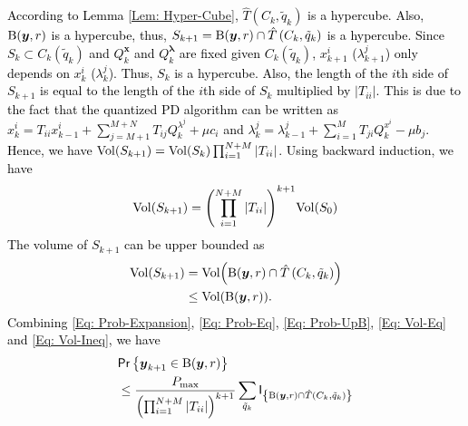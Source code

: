 \documentclass[10pt,twocolumn,twoside]{IEEEtran}
\begin{document}
\begin{IEEEproof}
\textcolor{black}{According to Lemma \ref{Lem: Hyper-Cube}, ${\ensuremath{\hat{T}\left({C_k},{\tilde{q}_k}\right)}}$ is a hypercube. Also, ${\rm B}{\left({{\ensuremath{\boldsymbol{{y}}}},r}\right)}$ is a hypercube, thus,  $S_{k+1}={\rm B}{\left({{\ensuremath{\boldsymbol{{y}}}},r}\right)}\cap {\ensuremath{\hat{T}\left({C_k},{\tilde{q}_k}\right)}}$ is a hypercube. Since $S_k\subset C_k{\left({\tilde{q}_k}\right)}$ and  $Q^{{\ensuremath{\boldsymbol{{x}}}}}_k$ and $Q^{{\ensuremath{\boldsymbol{{\lambda}}}}}_k$ are fixed given $C_k{\left({\tilde{q}_k}\right)}$,  $x^{i}_{k+1}$ ($\lambda^{j}_{k+1}$) only depends on $x^{i}_{k}$ ($\lambda^{j}_{k}$). Thus, $S_k$ is a hypercube. Also, the length of the $i$th side of $S_{k+1}$ is equal to the length of the $i$th side of $S_{k}$ multiplied by ${\left|{T_{ii}}\right|}$. This is due to the fact that the quantized PD algorithm can be written as $x^{i}_{k}=T_{ii}x^{i}_{k-1}+\sum_{j=M+1}^{M+N}T_{ij}Q^{\lambda^j}_k+\mu c_i$ and $\lambda^{j}_{k}=\lambda^j_{k-1}+\sum_{i=1}^MT_{ji}Q^{x^i}_k-\mu b_j$. Hence, we have ${\rm Vol}{\left({S_{k+1}}\right)}={\rm Vol}{\left({S_k}\right)}\prod_{i=1}^{N+M}{\left|{T_{ii}}\right|}$. Using backward induction, we have 
\begin{align}\label{Eq: Vol-Eq}
{\rm Vol}{\left({S_{k+1}}\right)}={\left({\prod_{i=1}^{N+M}{\left|{T_{ii}}\right|}}\right)}^{k+1}{\rm Vol}{\left({S_0}\right)}
\end{align}
The volume of $S_{k+1}$ can be upper bounded as
\begin{align}\label{Eq: Vol-Ineq}
{\rm Vol}{\left({S_{k+1}}\right)}&={\rm Vol}{\left({{\rm B}{\left({{\ensuremath{\boldsymbol{{y}}}},r}\right)}\cap {\ensuremath{\hat{T}\left({C_k},{\tilde{q}_k}\right)}}}\right)}\nonumber\\
&\leq {\rm Vol}{\left({{\rm B}{\left({{\ensuremath{\boldsymbol{{y}}}},r}\right)}}\right)}.
\end{align}
Combining \eqref{Eq: Prob-Expansion}, \eqref{Eq: Prob-Eq}, \eqref{Eq: Prob-UpB}, \eqref{Eq: Vol-Eq} and \eqref{Eq: Vol-Ineq}, we have
\begin{align}
&{\ensuremath{\mathsf{Pr}\left\{{{\ensuremath{\boldsymbol{{y}}}}_{k+1}\in{\rm B}{\left({{\ensuremath{\boldsymbol{{y}}}},r}\right)}}\right\}}}\nonumber\\
&\leq \frac{P_{\rm max}}{{\left({\prod_{i=1}^{N+M}{\left|{T_{ii}}\right|}}\right)}^{k+1}}\sum_{\tilde{q}_k}{\ensuremath{\mathsf{I}_{\left\{{{\rm B}{\left({{\ensuremath{\boldsymbol{{y}}}},r}\right)}\cap {\ensuremath{\hat{T}\left({C_k},{\tilde{q}_k}\right)}}}\right\}}}}
\end{align}
}
\end{IEEEproof}
\end{document}

